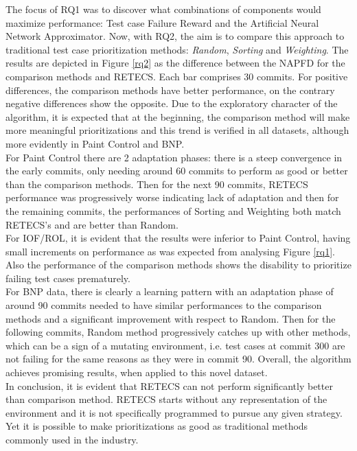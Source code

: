 The focus of RQ1 was to discover what combinations of components would maximize performance: Test case Failure Reward and the Artificial Neural Network Approximator. Now, with RQ2, the aim is to compare this approach to traditional test case prioritization methods: \textit{Random}, \textit{Sorting} and \textit{Weighting}. The results are depicted in Figure \ref{rq2} as the difference between the NAPFD for the comparison methods and RETECS. Each bar comprises 30 commits. For positive differences, the comparison methods have better performance, on the contrary negative differences show the opposite. 
Due to the exploratory character of the algorithm, it is expected that at the beginning, the comparison method will make more meaningful prioritizations and this trend is verified in all datasets, although more evidently in Paint Control and BNP. 
\\

For Paint Control there are 2 adaptation phases: there is a steep convergence in the early commits, only needing around 60 commits to perform as good or better than the comparison methods. Then for the next 90 commits, RETECS performance was progressively worse indicating lack of adaptation and then for the remaining commits, the performances of Sorting and Weighting both match RETECS's and are better than Random. 
\\

For IOF/ROL, it is evident that the results were inferior to Paint Control, having small increments on performance as was expected from analysing Figure \ref{rq1}. Also the performance of the comparison methods shows the disability to prioritize failing test cases prematurely.
\\

For BNP data, there is clearly a learning pattern with an adaptation phase of around 90 commits needed to have similar performances to the comparison methods and a significant improvement with respect to Random. Then for the following commits, Random method progressively catches up with other methods, which can be a sign of a mutating environment, i.e. test cases at commit 300 are not failing for the same reasons as they were in commit 90. Overall, the algorithm achieves promising results, when applied to this novel dataset.
\\

In conclusion, it is evident that RETECS can not perform significantly better than comparison method. RETECS starts without any representation of the environment and it is not specifically programmed to pursue any given strategy. Yet it is possible to make prioritizations as good as traditional methods commonly used in the industry. 


